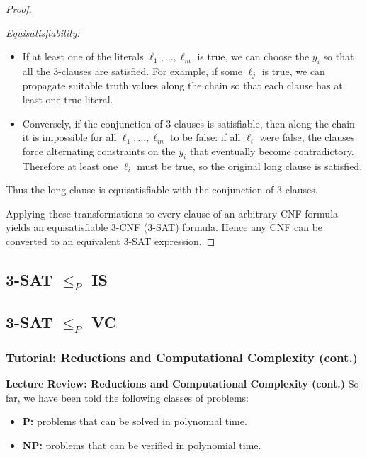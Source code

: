 \documentclass[9pt]{extarticle}
\begin{document}
\begin{proof}
\begin{itemize}
    \emph{Equisatisfiability:}
    \begin{itemize}
      \item If at least one of the literals \(\ell_1,\dots,\ell_m\) is true,
            we can choose the \(y_i\) so that all the 3-clauses are satisfied.
            For example, if some \(\ell_j\) is true, we can propagate suitable
            truth values along the chain so that each clause has at least one
            true literal.
      \item Conversely, if the conjunction of 3-clauses is satisfiable, then
            along the chain it is impossible for all \(\ell_1,\dots,\ell_m\) to
            be false: if all \(\ell_i\) were false, the clauses force alternating
            constraints on the \(y_i\) that eventually become contradictory.
            Therefore at least one \(\ell_i\) must be true, so the original
            long clause is satisfied.
    \end{itemize}
    Thus the long clause is equisatisfiable with the conjunction of 3-clauses.
  \end{itemize}

  Applying these transformations to every clause of an arbitrary CNF formula
  yields an equisatisfiable 3-CNF (3-SAT) formula. Hence any CNF can be
  converted to an equivalent 3-SAT expression.
\end{proof}


\subsection{3-SAT $\leq_P$ IS}

\subsection{3-SAT $\leq_P$ VC}


\subsubsection*{Tutorial: Reductions and Computational Complexity (cont.)}
\noindent
\textbf{Lecture Review: Reductions and Computational Complexity (cont.)}
\noindent
So far, we have been told the following classes of problems:

\begin{itemize}
    \item \textbf{P:} problems that can be solved in polynomial time.
    \item \textbf{NP:} problems that can be verified in polynomial time.
\end{itemize}
\end{document}
